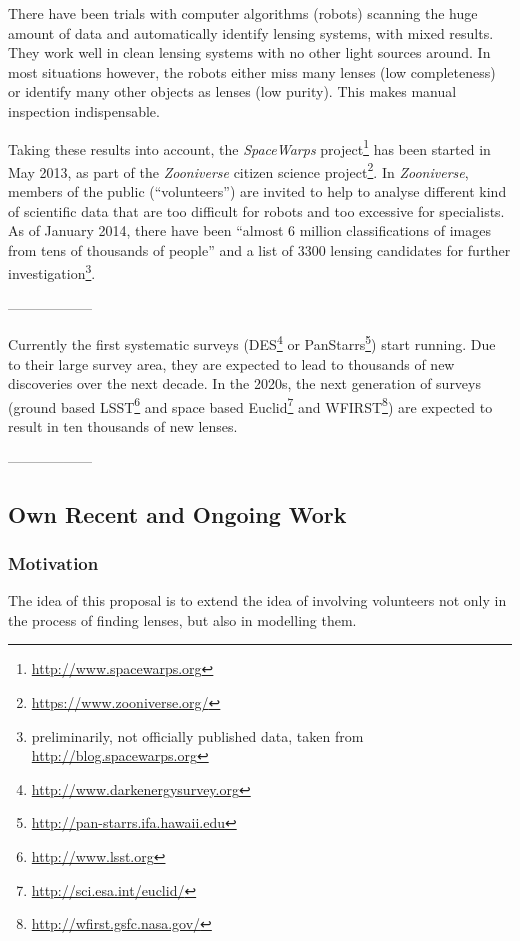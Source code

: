 \documentclass[11pt]{article}
\begin{document}
There have been trials with computer algorithms (robots) scanning the huge amount of data and automatically identify lensing systems\cite{robots}, with mixed results.
They work well in clean lensing systems with no other light sources around.
In most situations however, the robots either miss many lenses (low completeness) or identify many other objects as lenses (low purity).
This makes manual inspection indispensable.

Taking these results into account, the \emph{SpaceWarps} project\footnote{\url{http://www.spacewarps.org}} has been started in May 2013, as part of the \emph{Zooniverse} citizen science project\footnote{\url{https://www.zooniverse.org/}}.
In \emph{Zooniverse}, members of the public (``volunteers'') are invited to help to analyse different kind of scientific data that are too difficult for robots and too excessive for specialists.
As of January 2014, there have been ``almost 6 million classifications of images from tens of thousands of people'' and a list of 3300 lensing candidates for further investigation\footnote{preliminarily, not officially published data, taken from \url{http://blog.spacewarps.org}}.







------------------

Currently the first systematic surveys (DES\footnote{\url{http://www.darkenergysurvey.org}} or PanStarrs\footnote{\url{http://pan-starrs.ifa.hawaii.edu}}) start running.
Due to their large survey area, they are expected to lead to thousands of new discoveries over the next decade.
In the 2020s, the next generation of surveys (ground based LSST\footnote{\url{http://www.lsst.org}} and space based Euclid\footnote{\url{http://sci.esa.int/euclid/}} and WFIRST\footnote{\url{http://wfirst.gsfc.nasa.gov/}}) are expected to result in ten thousands of new lenses.

------------------


\subsection{Own Recent and Ongoing Work}

\subsubsection{Motivation}

The idea of this proposal is to extend the idea of involving volunteers not only in the process of finding lenses, but also in modelling them.
\end{document}
